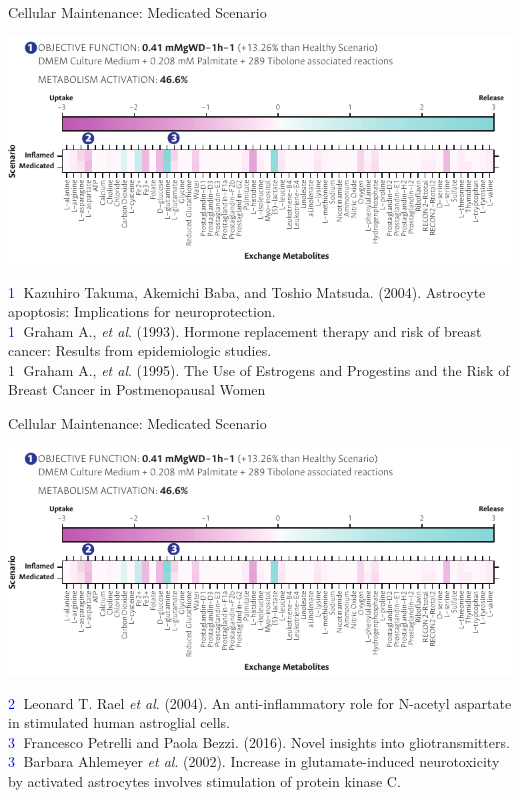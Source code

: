 \documentclass[11pt]{beamer}
\begin{document}
\begin{frame}{Cellular Maintenance: Medicated Scenario}
\begin{center}
\includegraphics[width=\textwidth]{M-results}
\end{center}
\textcolor{blue}{\textcircled{{\tiny 1}}} {\tiny Kazuhiro Takuma, Akemichi Baba, and Toshio Matsuda. (2004). Astrocyte apoptosis: Implications for neuroprotection. \vspace{0.1cm}\\}
\textcolor{blue}{\textcircled{{\tiny 1}}} {\tiny Graham A., \textit{et al}. (1993). Hormone replacement therapy and risk of breast cancer: Results from epidemiologic studies. \vspace{0.1cm}\\}
\textcolor{blue}{\textcircled{{\tiny 1}}} {\tiny Graham A., \textit{et al}. (1995). The Use of Estrogens and Progestins and the Risk of Breast Cancer in Postmenopausal Women\\}
\end{frame}
\begin{frame}{Cellular Maintenance: Medicated Scenario}
\begin{center}
\includegraphics[width=\textwidth]{M-results}
\end{center}
\textcolor{blue}{\textcircled{{\tiny 2}}} {\tiny Leonard T. Rael \textit{et al}. (2004). An anti-inflammatory role for N-acetyl aspartate in stimulated human astroglial cells.\vspace{0.3cm}\\}\pause
\textcolor{blue}{\textcircled{{\tiny 3}}} {\tiny Francesco Petrelli and Paola Bezzi. (2016). Novel insights into gliotransmitters. \vspace{0.1cm}\\}
\textcolor{blue}{\textcircled{{\tiny 3}}} {\tiny Barbara Ahlemeyer \textit{et al}. (2002). Increase in glutamate-induced neurotoxicity by activated astrocytes involves stimulation of protein kinase C.\\}
\end{frame}
\end{document}
